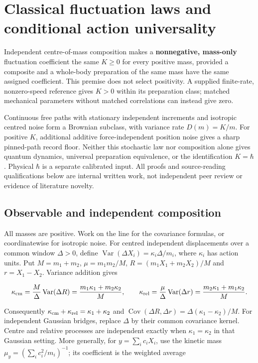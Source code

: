 \documentclass[11pt,a4paper]{article}
\begin{document}
\hypertarget{classical-fluctuation-laws-and-conditional-action-universality}{%
\section{Classical fluctuation laws and conditional action
universality}\label{classical-fluctuation-laws-and-conditional-action-universality}}

Independent centre-of-mass composition makes a \textbf{nonnegative,
mass-only} fluctuation coefficient the same \(K\ge0\) for every positive
mass, provided a composite and a whole-body preparation of the same mass
have the same assigned coefficient. This premise does not select
positivity. A supplied finite-rate, nonzero-speed reference gives
\(K>0\) within its preparation class; matched mechanical parameters
without matched correlations can instead give zero.

Continuous free paths with stationary independent increments and
isotropic centred noise form a Brownian subclass, with variance rate
\(D(m)=K/m\). For positive \(K\), additional additive force-independent
position noise gives a sharp pinned-path record floor. Neither this
stochastic law nor composition alone gives quantum dynamics, universal
preparation equivalence, or the identification \(K=\hbar\). Physical
\(\hbar\) is a separate calibrated input. All proofs and source-reading
qualifications below are internal written work, not independent peer
review or evidence of literature novelty.

\hypertarget{observable-and-independent-composition}{%
\subsection{Observable and independent
composition}\label{observable-and-independent-composition}}

All masses are positive. Work on the line for the covariance formulas,
or coordinatewise for isotropic noise. For centred independent
displacements over a common window \(\Delta>0\), define
\(\operatorname{Var}(\Delta X_i)=\kappa_i\Delta/m_i\), where
\(\kappa_i\) has action units. Put \(M=m_1+m_2\), \(\mu=m_1m_2/M\),
\(R=(m_1X_1+m_2X_2)/M\) and \(r=X_1-X_2\). Variance addition gives

\[\kappa_{\rm cm}=\frac M\Delta\operatorname{Var}(\Delta R)
 =\frac{m_1\kappa_1+m_2\kappa_2}{M},\qquad
\kappa_{\rm rel}=\frac\mu\Delta\operatorname{Var}(\Delta r)
 =\frac{m_2\kappa_1+m_1\kappa_2}{M}.\]

Consequently \(\kappa_{\rm cm}+\kappa_{\rm rel}=\kappa_1+\kappa_2\) and
\(\operatorname{Cov}(\Delta R,\Delta r)=\Delta(\kappa_1-\kappa_2)/M\).
For independent Gaussian bridges, replace \(\Delta\) by their common
covariance kernel. Centre and relative processes are independent exactly
when \(\kappa_1=\kappa_2\) in that Gaussian setting. More generally, for
\(y=\sum_i c_iX_i\), use the kinetic mass
\(\mu_y=(\sum_i c_i^2/m_i)^{-1}\); its coefficient is the weighted
average
\end{document}
